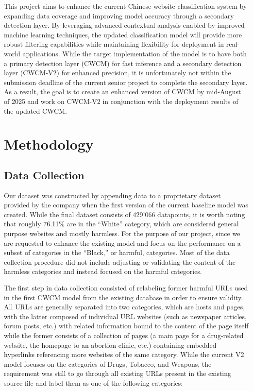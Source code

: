 \documentclass[
  titlepage]{article}
\begin{document}
This project aims to enhance the current Chinese website classification
system by expanding data coverage and improving model accuracy through a
secondary detection layer. By leveraging advanced contextual analysis
enabled by improved machine learning techniques, the updated
classification model will provide more robust filtering capabilities
while maintaining flexibility for deployment in real-world applications.
While the target implementation of the model is to have both a primary
detection layer (CWCM) for fast inference and a secondary detection
layer (CWCM-V2) for enhanced precision, it is unfortunately not within
the submission deadline of the current senior project to complete the
secondary layer. As a result, the goal is to create an enhanced version
of CWCM by mid-August of 2025 and work on CWCM-V2 in conjunction with
the deployment results of the updated CWCM.

\section{Methodology}\label{methodology}

\subsection{Data Collection}\label{data-collection}

Our dataset was constructed by appending data to a proprietary dataset
provided by the company when the first version of the current baseline
model was created. While the final dataset consists of 429'066
datapoints, it is worth noting that roughly 76.11\% are in the ``White''
category, which are considered general purpose websites and mostly
harmless. For the purpose of our project, since we are requested to
enhance the existing model and focus on the performance on a subset of
categories in the ``Black,'' or harmful, categories. Most of the data
collection procedure did not include adjusting or validating the content
of the harmless categories and instead focused on the harmful
categories.

The first step in data collection consisted of relabeling former harmful
URLs used in the first CWCM model from the existing database in order to
ensure validity. All URLs are generally separated into two categories,
which are hosts and pages, with the latter composed of individual URL
websites (such as newspaper articles, forum posts, etc.) with related
information bound to the content of the page itself while the former
consists of a collection of pages (a main page for a drug-related
website, the homepage to an abortion clinic, etc.) containing embedded
hyperlinks referencing more websites of the same category. While the
current V2 model focuses on the categories of Drugs, Tobacco, and
Weapons, the requirement was still to go through all existing URLs
present in the existing source file and label them as one of the
following categories:
\end{document}
